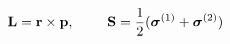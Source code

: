 \begin{equation}
{\bf L} = {\bf r} \times {\bf p},~~~~~~~ {\bf S} = \frac{1}{2} 
(\mbox{\boldmath $\sigma$}^{(1)} + \mbox{\boldmath $\sigma$}^{(2)}) \nonumber
\end{equation}

